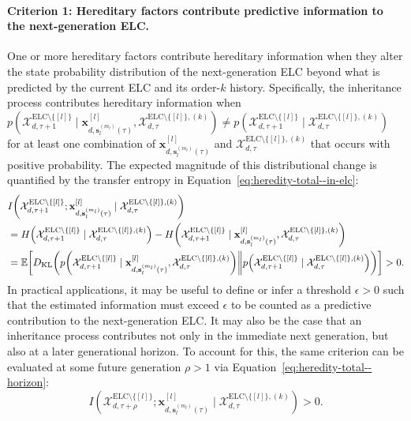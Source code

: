 \documentclass[pdflatex,sn-mathphys-num]{sn-jnl}
\theoremstyle{thmstylethree}
\theoremstyle{thmstyleone}
\newcommand{\ELC}{\mathrm{ELC}}
\begin{document}
\paragraph{Criterion 1: Hereditary factors contribute predictive information to the next-generation ELC.}
One or more hereditary factors contribute hereditary information when they alter the state probability distribution of the next-generation ELC beyond what is predicted by the current ELC and its order-$k$ history. Specifically, the  inheritance process contributes hereditary information when
$p\!\left(
\mathcal{X}_{d,\tau+1}^{\ELC\setminus\{[l]\}}
\mid
\mathbf{x}^{[l]}_{d,\mathbf{s}^{(m_l)}_l(\tau)},
\mathcal{X}_{d,\tau}^{\ELC\setminus\{[l]\},(k)}
\right)
\neq
p\!\left(
\mathcal{X}_{d,\tau+1}^{\ELC\setminus\{[l]\}}
\mid
\mathcal{X}_{d,\tau}^{\ELC\setminus\{[l]\},(k)}
\right)
$
for at least one combination of
$\mathbf{x}^{[l]}_{d,\mathbf{s}^{(m_l)}_l(\tau)}$
and
$\mathcal{X}_{d,\tau}^{\ELC\setminus\{[l]\},(k)}$
that occurs with positive probability. The expected magnitude of this distributional change is quantified by the transfer entropy in Equation~\eqref{eq:heredity-total--in-elc}:
\begin{align}
&I\!\left(
\mathcal{X}_{d,\tau+1}^{\ELC\setminus\{[l]\}};
\mathbf{x}^{[l]}_{d,\mathbf{s}^{(m_l)}_l(\tau)}
\mid
\mathcal{X}_{d,\tau}^{\ELC\setminus\{[l]\},(k)}
\right)
\notag\\
&=
H\!\left(
\mathcal{X}_{d,\tau+1}^{\ELC\setminus\{[l]\}}
\mid
\mathcal{X}_{d,\tau}^{\ELC\setminus\{[l]\},(k)}
\right)
-
H\!\left(
\mathcal{X}_{d,\tau+1}^{\ELC\setminus\{[l]\}}
\mid
\mathbf{x}^{[l]}_{d,\mathbf{s}^{(m_l)}_l(\tau)},
\mathcal{X}_{d,\tau}^{\ELC\setminus\{[l]\},(k)}
\right)
\notag\\
&=
\mathbb{E}\!\left[
D_{\mathrm{KL}}\!\left(
p\!\left(
\mathcal{X}_{d,\tau+1}^{\ELC\setminus\{[l]\}}
\mid
\mathbf{x}^{[l]}_{d,\mathbf{s}^{(m_l)}_l(\tau)},
\mathcal{X}_{d,\tau}^{\ELC\setminus\{[l]\},(k)}
\right)
\middle\|
p\!\left(
\mathcal{X}_{d,\tau+1}^{\ELC\setminus\{[l]\}}
\mid
\mathcal{X}_{d,\tau}^{\ELC\setminus\{[l]\},(k)}
\right)
\right)
\right]
>0.
\label{eq:heredity-total--in-elc}
\end{align}
In practical applications, it may be useful to define or infer a threshold $\epsilon>0$ such that the estimated information must exceed $\epsilon$ to be counted as a predictive contribution to the next-generation ELC. It may also be the case that an  inheritance process contributes not only in the immediate next generation, but also at a later generational horizon. To account for this, the same criterion can be evaluated at some future generation $\rho >1$ via Equation~\ref{eq:heredity-total--horizon}:
\begin{equation}
\label{eq:heredity-total--horizon}
I\!\left(
\mathcal{X}_{d,\tau+\rho}^{\ELC\setminus\{[l]\}};
\mathbf{x}^{[l]}_{d,\mathbf{s}^{(m_l)}_l(\tau)}
\mid
\mathcal{X}_{d,\tau}^{\ELC\setminus\{[l]\},(k)}
\right)>0.
\end{equation}
\end{document}
